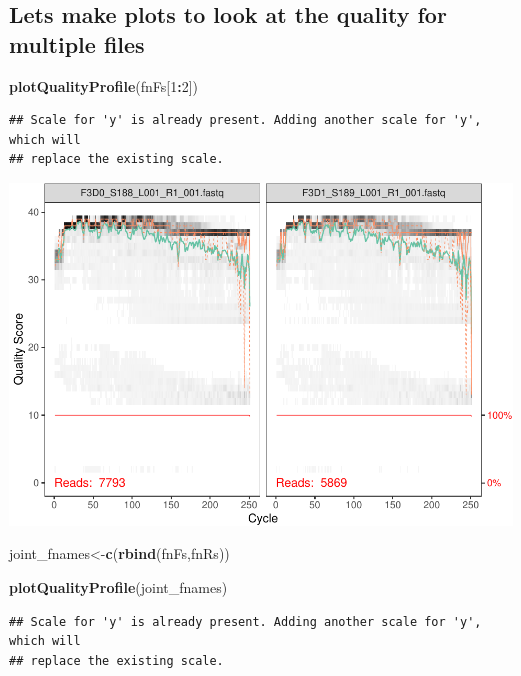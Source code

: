 \documentclass[
]{book}
\newenvironment{Shaded}{\begin{snugshade}}{\end{snugshade}}
\newcommand{\DecValTok}[1]{\textcolor[rgb]{0.00,0.00,0.81}{#1}}
\newcommand{\KeywordTok}[1]{\textcolor[rgb]{0.13,0.29,0.53}{\textbf{#1}}}
\newcommand{\NormalTok}[1]{#1}
\newcommand{\OperatorTok}[1]{\textcolor[rgb]{0.81,0.36,0.00}{\textbf{#1}}}
\begin{document}
\hypertarget{lets-make-plots-to-look-at-the-quality-for-multiple-files}{%
\subsection{Lets make plots to look at the quality for multiple files}\label{lets-make-plots-to-look-at-the-quality-for-multiple-files}}

\begin{Shaded}
\begin{Highlighting}[]
\KeywordTok{plotQualityProfile}\NormalTok{(fnFs[}\DecValTok{1}\OperatorTok{:}\DecValTok{2}\NormalTok{])}
\end{Highlighting}
\end{Shaded}

\begin{verbatim}
## Scale for 'y' is already present. Adding another scale for 'y', which will
## replace the existing scale.
\end{verbatim}

\includegraphics{16sworkshop_files/figure-latex/make_plots-1.pdf}

\begin{Shaded}
\begin{Highlighting}[]
\NormalTok{joint_fnames<-}\KeywordTok{c}\NormalTok{(}\KeywordTok{rbind}\NormalTok{(fnFs,fnRs))}

\KeywordTok{plotQualityProfile}\NormalTok{(joint_fnames)}
\end{Highlighting}
\end{Shaded}

\begin{verbatim}
## Scale for 'y' is already present. Adding another scale for 'y', which will
## replace the existing scale.
\end{verbatim}
\end{document}

